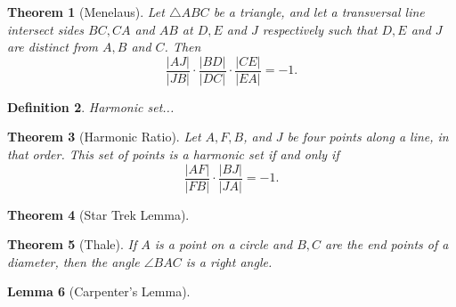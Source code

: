 \documentclass[12pt]{amsart}
\newtheorem{theorem}{Theorem}
\newtheorem{lemma}[theorem]{Lemma}
\newtheorem{definition}[theorem]{Definition}
\theoremstyle{remark}
\newtheorem*{basic notion}{Basic Notion}
\theoremstyle{mycomment}
\begin{document}
\begin{theorem}[Menelaus] Let $\triangle ABC$ be a triangle, and let a transversal line intersect sides $BC, CA$ and $AB$ at $D, E$ and $J$ respectively such that $D, E$ and $J$ are distinct from $A, B$ and $C$. Then $$\frac{|AJ|}{|JB|}\cdot\frac{|BD|}{|DC|}\cdot\frac{|CE|}{|EA|}=-1.$$
\end{theorem}
\begin{definition} Harmonic set...\end{definition}
\begin{theorem}[Harmonic Ratio] Let $A, F, B$, and $J$ be four points along a line, in that order. This set of points is a harmonic set if and only if $$\frac{|AF|}{|FB|}\cdot\frac{|BJ|}{|JA|}=-1.$$\end{theorem}
\begin{theorem}[Star Trek Lemma]
\end{theorem}
\begin{theorem}[Thale] If $A$ is a point on a circle and $B,C$ are the end points of a diameter, then the angle $\angle BAC$ is  a right angle.\end{theorem}
\begin{lemma}[Carpenter's Lemma]
\end{lemma}
 
\end{document}
